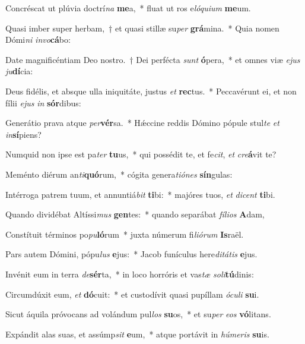 \item Concréscat ut plúvia doctrí\textit{na} \textbf{me}a,~* fluat ut ros e\textit{ló}\textit{qui}\textit{um} \textbf{me}um.
\item Quasi imber super herbam,~† et quasi stillæ su\textit{per} \textbf{grá}mina.~* Quia nomen Dómi\textit{ni} \textit{in}\textit{vo}\textbf{cá}bo:
\item Date magnificéntiam Deo nostro.~† Dei perfécta \textit{sunt} \textbf{ó}pera,~* et omnes viæ \textit{e}\textit{jus} \textit{ju}\textbf{dí}cia:
\item Deus fidélis, et absque ulla iniquitáte, justus \textit{et} \textbf{rec}tus.~* Peccavérunt ei, et non fílii \textit{e}\textit{jus} \textit{in} \textbf{sór}dibus:
\item Generátio prava atque \textit{per}\textbf{vér}sa.~* Hǽccine reddis Dómino pópule stul\textit{te} \textit{et} \textit{in}\textbf{sí}piens?
\item Numquid non ipse est pa\textit{ter} \textbf{tu}us,~* qui possédit te, et fe\textit{cit}, \textit{et} \textit{cre}\textbf{á}vit te?
\item Meménto diérum an\textit{ti}\textbf{quó}rum,~* cógita genera\textit{ti}\textit{ó}\textit{nes} \textbf{sín}gulas:
\item Intérroga patrem tuum, et annuntiá\textit{bit} \textbf{ti}bi:~* majóres tuos, \textit{et} \textit{di}\textit{cent} \textbf{ti}bi.
\item Quando dividébat Altíssi\textit{mus} \textbf{gen}tes:~* quando separábat \textit{fí}\textit{li}\textit{os} \textbf{A}dam,
\item Constítuit términos po\textit{pu}\textbf{ló}rum~* juxta númerum fi\textit{li}\textit{ó}\textit{rum} \textbf{Is}raël.
\item Pars autem Dómini, pópu\textit{lus} \textbf{e}jus:~* Jacob funículus here\textit{di}\textit{tá}\textit{tis} \textbf{e}jus.
\item Invénit eum in terra \textit{de}\textbf{sér}ta,~* in loco horróris et vas\textit{tæ} \textit{so}\textit{li}\textbf{tú}dinis:
\item Circumdúxit eum, \textit{et} \textbf{dó}cuit:~* et custodívit quasi pupíllam \textit{ó}\textit{cu}\textit{li} \textbf{su}i.
\item Sicut áquila próvocans ad volándum pul\textit{los} \textbf{su}os,~* et su\textit{per} \textit{e}\textit{os} \textbf{vó}litans.
\item Expándit alas suas, et assúmp\textit{sit} \textbf{e}um,~* atque portávit in \textit{hú}\textit{me}\textit{ris} \textbf{su}is.
